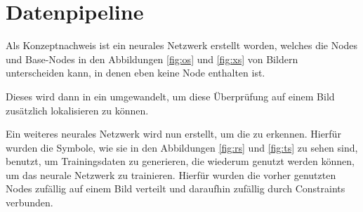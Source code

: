 \section{Datenpipeline}
Als Konzeptnachweis ist ein neurales Netzwerk erstellt worden, welches die Nodes und Base-Nodes in den Abbildungen \ref{fig:os} und \ref{fig:xs} von Bildern unterscheiden kann, in denen eben keine Node enthalten ist. 

Dieses wird dann in ein \cite{Long2014} umgewandelt, um diese Überprüfung auf einem Bild zusätzlich lokalisieren zu können.

Ein weiteres neurales Netzwerk wird nun erstellt, um die  zu erkennen.
Hierfür wurden die Symbole, wie sie in den Abbildungen \ref{fig:rs} und \ref{fig:ts} zu sehen sind, benutzt, um Trainingsdaten zu generieren, die wiederum genutzt werden können, um das neurale Netzwerk zu trainieren.
Hierfür wurden die vorher genutzten Nodes zufällig auf einem Bild verteilt und daraufhin zufällig durch Constraints verbunden.

